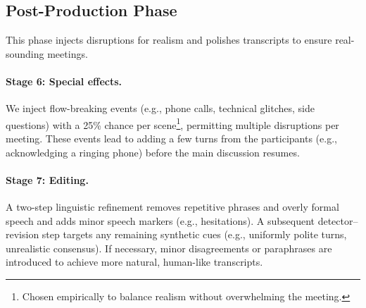 \subsection{Post-Production Phase}
This phase injects disruptions for realism and polishes transcripts to ensure real-sounding meetings.



\paragraph{Stage 6: Special effects.}
We inject flow-breaking events (e.g., phone calls, technical glitches, side questions) with a 25\% chance per scene\footnote{Chosen empirically to balance realism without overwhelming the meeting.}, permitting multiple disruptions per meeting.
These events lead to adding a few turns from the participants (e.g., acknowledging a ringing phone) before the main discussion resumes.

\paragraph{Stage 7: Editing.}
A two-step linguistic refinement removes repetitive phrases and overly formal speech and adds minor speech markers (e.g., hesitations).
A subsequent detector–revision step targets any remaining synthetic cues (e.g., uniformly polite turns, unrealistic consensus).
If necessary, minor disagreements or paraphrases are introduced to achieve more natural, human-like transcripts.
